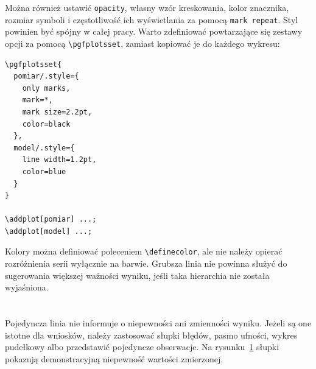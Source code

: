 Można również ustawić \texttt{opacity}, własny wzór kreskowania, kolor znacznika, rozmiar symboli i częstotliwość ich wyświetlania za pomocą \texttt{mark repeat}. Styl powinien być spójny w całej pracy. Warto zdefiniować powtarzające się zestawy opcji za pomocą \verb|\pgfplotsset|, zamiast kopiować je do każdego wykresu:

\begin{lstlisting}[caption={\ploren{Definicja własnych stylów wykresu}{Definition of custom plot styles}}]
\pgfplotsset{
  pomiar/.style={
    only marks,
    mark=*,
    mark size=2.2pt,
    color=black
  },
  model/.style={
    line width=1.2pt,
    color=blue
  }
}

\addplot[pomiar] ...;
\addplot[model] ...;
\end{lstlisting}

Kolory można definiować poleceniem \verb|\definecolor|, ale nie należy opierać rozróżnienia serii wyłącznie na barwie. Grubsza linia nie powinna służyć do sugerowania większej ważności wyniku, jeśli taka hierarchia nie została wyjaśniona.

\section{}

Pojedyncza linia nie informuje o niepewności ani zmienności wyniku. Jeżeli są one istotne dla wniosków, należy zastosować słupki błędów, pasmo ufności, wykres pudełkowy albo przedstawić pojedyncze obserwacje. Na rysunku~\ref{fig:wykres-niepewnosc} słupki pokazują demonstracyjną niepewność wartości zmierzonej.

\begin{figure}[htbp]
  \centering
  \caption{}
  \label{fig:wykres-niepewnosc}
\end{figure}

